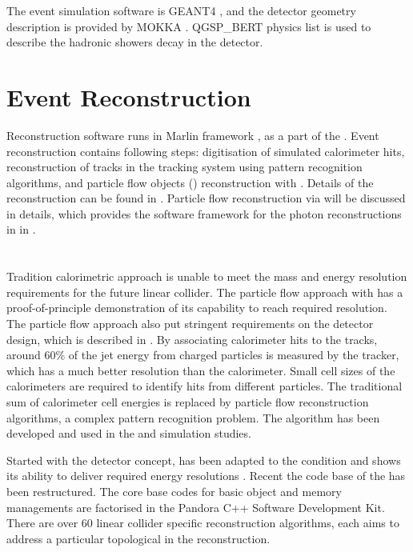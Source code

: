 The event simulation software is GEANT4 \cite{Agostinelli:2002hh}, and the detector geometry description is provided by MOKKA \cite{MoradeFreitas:2002kj}.  QGSP\_BERT physics list is used to describe the hadronic showers decay in the detector.

\section{Event Reconstruction}

Reconstruction software runs in Marlin framework \cite{Gaede:2006pj}, as a part of the \ilcsoft. Event reconstruction contains following steps: digitisation of simulated calorimeter hits, reconstruction of tracks in the tracking system using pattern recognition algorithms, and particle flow objects (\PFOs) reconstruction with \pandora\cite{Thomson:2009rp,Marshall:2012ry}. Details of the reconstruction can be found in \cite{Brau:2007zza,Linssen:2012hp}. Particle flow reconstruction via \pandora will be discussed in details, which provides the software framework for the photon reconstructions in \pandora in .

\section{\pandora}
\label{sec:pandoraPandoraPFA}

Tradition calorimetric approach is unable to meet the mass and energy resolution requirements for the future linear collider. The particle flow approach with \pandora has a proof-of-principle demonstration of its capability to reach required resolution. The particle flow approach also put stringent requirements on the detector design, which is described in . By associating calorimeter hits to the tracks, around 60\% of the jet energy from charged particles is measured by the tracker, which has a much better resolution than the calorimeter. Small cell sizes of the calorimeters are required to identify hits from different particles. The traditional sum of calorimeter cell energies is replaced by particle flow reconstruction algorithms, a complex pattern recognition problem.  The \pandora algorithm has been developed and used in the \ILC and \CLIC simulation studies.

Started with the \ILD detector concept, \pandora has been adapted to the \CLIC condition and shows its ability to deliver required energy resolutions \cite{Linssen:2012hp}. Recent the code base of the \pandora has been restructured. The core base codes for basic object and memory managements are factorised in the Pandora C++ Software Development Kit\cite{Marshall:2015rfa}. There are over 60 linear collider specific reconstruction algorithms, each aims to address a particular topological in the reconstruction.

